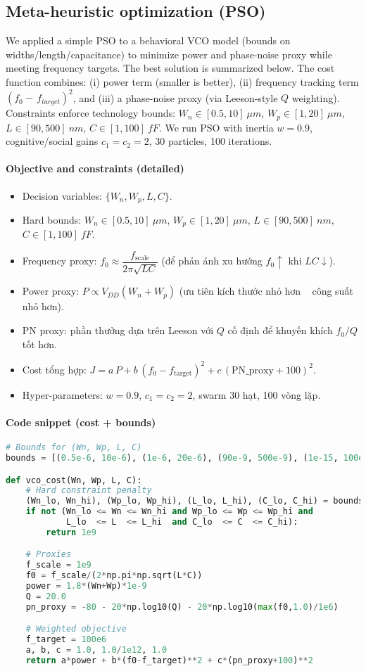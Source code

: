 \subsection*{Meta-heuristic optimization (PSO)}
We applied a simple PSO to a behavioral VCO model (bounds on widths/length/capacitance) to minimize power and phase-noise proxy while meeting frequency targets. The best solution is summarized below.
The cost function combines: (i) power term (smaller is better), (ii) frequency tracking term $(f_0-\,f_{target})^2$, and (iii) a phase-noise proxy (via Leeson-style $Q$ weighting). Constraints enforce technology bounds: $W_n\in[0.5,10]~\mu m$, $W_p\in[1,20]~\mu m$, $L\in[90,500]~nm$, $C\in[1,100]~fF$.
We run PSO with inertia $w=0.9$, cognitive/social gains $c_1=c_2=2$, 30 particles, 100 iterations.

\paragraph{Objective and constraints (detailed)}
\begin{itemize}
  \item Decision variables: $\{W_n, W_p, L, C\}$.
  \item Hard bounds: $W_n\in[0.5,10]~\mu m$, $W_p\in[1,20]~\mu m$, $L\in[90,500]~nm$, $C\in[1,100]~fF$.
  \item Frequency proxy: $f_0 \approx \dfrac{f_{\text{scale}}}{2\pi\sqrt{LC}}$ (để phản ánh xu hướng $f_0 \uparrow$ khi $LC \downarrow$).
  \item Power proxy: $P \propto V_{DD}(W_n+W_p)$ (ưu tiên kích thước nhỏ hơn ~ công suất nhỏ hơn).
  \item PN proxy: phần thưởng dựa trên Leeson với $Q$ cố định để khuyến khích $f_0/Q$ tốt hơn.
  \item Cost tổng hợp: $J = a\,P + b\,(f_0-f_{\text{target}})^2 + c\,(\text{PN\_proxy}+100)^2$.
  \item Hyper-parameters: $w=0.9$, $c_1=c_2=2$, swarm 30 hạt, 100 vòng lặp.
\end{itemize}

\paragraph{Code snippet (cost + bounds)}
\begin{lstlisting}[language=Python]
# Bounds for (Wn, Wp, L, C)
bounds = [(0.5e-6, 10e-6), (1e-6, 20e-6), (90e-9, 500e-9), (1e-15, 100e-15)]

def vco_cost(Wn, Wp, L, C):
    # Hard constraint penalty
    (Wn_lo, Wn_hi), (Wp_lo, Wp_hi), (L_lo, L_hi), (C_lo, C_hi) = bounds
    if not (Wn_lo <= Wn <= Wn_hi and Wp_lo <= Wp <= Wp_hi and
            L_lo  <= L  <= L_hi  and C_lo  <= C  <= C_hi):
        return 1e9

    # Proxies
    f_scale = 1e9
    f0 = f_scale/(2*np.pi*np.sqrt(L*C))
    power = 1.8*(Wn+Wp)*1e-9
    Q = 20.0
    pn_proxy = -80 - 20*np.log10(Q) - 20*np.log10(max(f0,1.0)/1e6)

    # Weighted objective
    f_target = 100e6
    a, b, c = 1.0, 1.0/1e12, 1.0
    return a*power + b*(f0-f_target)**2 + c*(pn_proxy+100)**2
\end{lstlisting}

